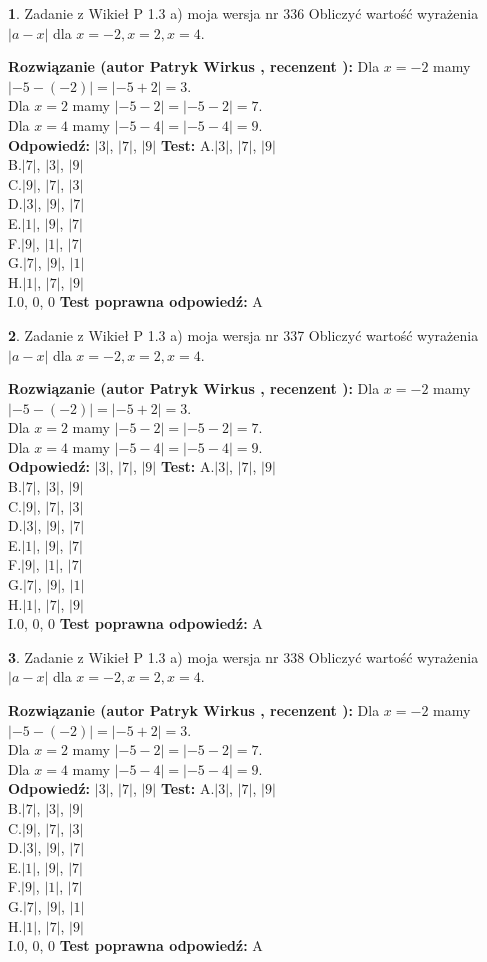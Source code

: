 \documentclass[12pt, a4paper]{article}
\theoremstyle{definition} %
\newtheorem{zad}{}
\newcommand{\zadStart}[1]{\begin{zad}#1\newline}
\newcommand{\zadStop}{\end{zad}}
\newcommand{\rozwStart}[2]{\noindent \textbf{Rozwiązanie (autor #1 , recenzent #2): }\newline}
\newcommand{\rozwStop}{\newline}
\newcommand{\odpStart}{\noindent \textbf{Odpowiedź:}\newline}
\newcommand{\odpStop}{\newline}
\newcommand{\testStart}{\noindent \textbf{Test:}\newline}
\newcommand{\testStop}{\newline}
\newcommand{\kluczStart}{\noindent \textbf{Test poprawna odpowiedź:}\newline}
\newcommand{\kluczStop}{\newline}
\begin{document}
\zadStart{Zadanie z Wikieł P 1.3 a) moja wersja nr 336}
Obliczyć wartość wyrażenia $|a - x|$ dla $x=-2,x=2,x=4$.
\zadStop
\rozwStart{Patryk Wirkus}{}
Dla $x = -2$ mamy $|-5 - (-2)| = |-5 + 2| = 3$.\\
Dla $x = 2$ mamy $|-5 - 2| = |-5 - 2| = 7$.\\
Dla $x = 4$ mamy $|-5 - 4| = |-5 - 4| = 9$.\\
\rozwStop
\odpStart
$|3|$, $|7|$, $|9|$
\odpStop
\testStart
A.$|3|$, $|7|$, $|9|$\\
B.$|7|$, $|3|$, $|9|$\\
C.$|9|$, $|7|$, $|3|$\\
D.$|3|$, $|9|$, $|7|$\\
E.$|1|$, $|9|$, $|7|$\\
F.$|9|$, $|1|$, $|7|$\\
G.$|7|$, $|9|$, $|1|$\\
H.$|1|$, $|7|$, $|9|$\\
I.$0$, $0$, $0$
\testStop
\kluczStart
A
\kluczStop



\zadStart{Zadanie z Wikieł P 1.3 a) moja wersja nr 337}
Obliczyć wartość wyrażenia $|a - x|$ dla $x=-2,x=2,x=4$.
\zadStop
\rozwStart{Patryk Wirkus}{}
Dla $x = -2$ mamy $|-5 - (-2)| = |-5 + 2| = 3$.\\
Dla $x = 2$ mamy $|-5 - 2| = |-5 - 2| = 7$.\\
Dla $x = 4$ mamy $|-5 - 4| = |-5 - 4| = 9$.\\
\rozwStop
\odpStart
$|3|$, $|7|$, $|9|$
\odpStop
\testStart
A.$|3|$, $|7|$, $|9|$\\
B.$|7|$, $|3|$, $|9|$\\
C.$|9|$, $|7|$, $|3|$\\
D.$|3|$, $|9|$, $|7|$\\
E.$|1|$, $|9|$, $|7|$\\
F.$|9|$, $|1|$, $|7|$\\
G.$|7|$, $|9|$, $|1|$\\
H.$|1|$, $|7|$, $|9|$\\
I.$0$, $0$, $0$
\testStop
\kluczStart
A
\kluczStop



\zadStart{Zadanie z Wikieł P 1.3 a) moja wersja nr 338}
Obliczyć wartość wyrażenia $|a - x|$ dla $x=-2,x=2,x=4$.
\zadStop
\rozwStart{Patryk Wirkus}{}
Dla $x = -2$ mamy $|-5 - (-2)| = |-5 + 2| = 3$.\\
Dla $x = 2$ mamy $|-5 - 2| = |-5 - 2| = 7$.\\
Dla $x = 4$ mamy $|-5 - 4| = |-5 - 4| = 9$.\\
\rozwStop
\odpStart
$|3|$, $|7|$, $|9|$
\odpStop
\testStart
A.$|3|$, $|7|$, $|9|$\\
B.$|7|$, $|3|$, $|9|$\\
C.$|9|$, $|7|$, $|3|$\\
D.$|3|$, $|9|$, $|7|$\\
E.$|1|$, $|9|$, $|7|$\\
F.$|9|$, $|1|$, $|7|$\\
G.$|7|$, $|9|$, $|1|$\\
H.$|1|$, $|7|$, $|9|$\\
I.$0$, $0$, $0$
\testStop
\kluczStart
A
\kluczStop
\end{document}

